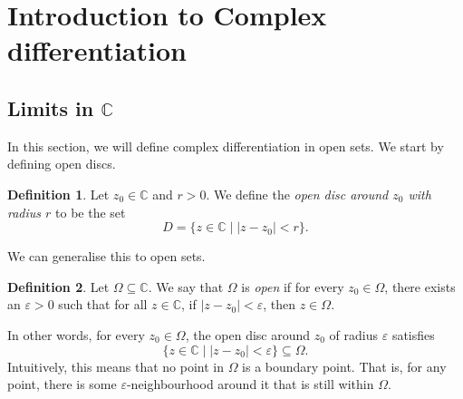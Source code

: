 \documentclass[a4paper, openany]{memoir}
\theoremstyle{definition}
\newtheorem{definition}{Definition}[section]
\theoremstyle{plain}
\begin{document}

\newpage

\section{Introduction to Complex differentiation}
\subsection{Limits in $\mathbb{C}$}
In this section, we will define complex differentiation in open sets. We start by defining open discs.
\begin{definition}
Let $z_0 \in \mathbb{C}$ and $r > 0$. We define the \emph{open disc around $z_0$ with radius $r$} to be the set
\[D = \{z \in \mathbb{C} \mid |z - z_0| < r\}.\]
\end{definition}
\noindent We can generalise this to open sets.
\begin{definition}
Let $\Omega \subseteq \mathbb{C}$. We say that $\Omega$ is \emph{open} if for every $z_0 \in \Omega$, there exists an $\varepsilon > 0$ such that for all $z \in \mathbb{C}$, if $|z - z_0| < \varepsilon$, then $z \in \Omega$.
\end{definition}
\noindent In other words, for every $z_0 \in \Omega$, the open disc around $z_0$ of radius $\varepsilon$ satisfies
\[\{z \in \mathbb{C} \mid |z - z_0| < \varepsilon\} \subseteq \Omega.\]
Intuitively, this means that no point in $\Omega$ is a boundary point. That is, for any point, there is some $\varepsilon$-neighbourhood around it that is still within $\Omega$. 
\end{document}
